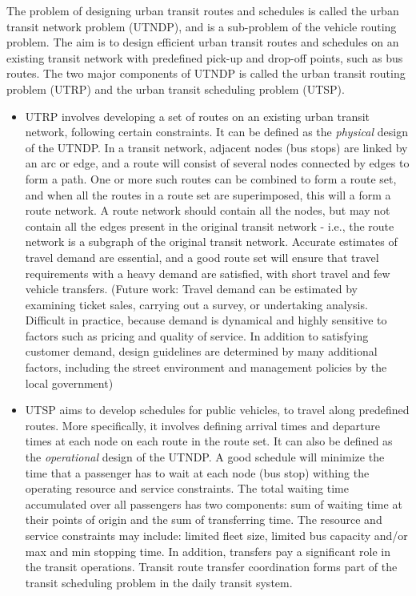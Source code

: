 The problem of designing urban transit routes and schedules is called the urban transit network problem (UTNDP), and is a sub-problem of the vehicle routing problem. The aim is to design efficient urban transit routes and schedules on an existing transit network with predefined pick-up and drop-off points, such as bus routes. The two major components of UTNDP is called the urban transit routing problem (UTRP) and the urban transit scheduling problem (UTSP).

\begin{itemize}
\item UTRP involves developing a set of routes on an existing urban transit network, following certain constraints. It can be defined as the \textit{physical} design of the UTNDP. In a transit network, adjacent nodes (bus stops) are linked by an arc or edge, and a route will consist of several nodes connected by edges to form a path. One or more such routes can be combined to form a route set, and when all the routes in a route set are superimposed, this will a form a route network. A route network should contain all the nodes, but may not contain all the edges present in the original transit network - i.e., the route network is a subgraph of the original transit network.  Accurate estimates of travel demand are essential, and a good route set will ensure that travel requirements with a heavy demand are satisfied, with short travel and few vehicle transfers. (Future work: Travel demand can be estimated by examining ticket sales, carrying out a survey, or undertaking analysis. Difficult in practice, because demand is dynamical and highly sensitive to factors such as pricing and quality of service. In addition to satisfying customer demand, design guidelines are determined by many additional factors, including the street environment and management policies by the local government)
\item UTSP aims to develop schedules for public vehicles, to travel along predefined routes. More specifically, it involves defining arrival times and departure times at each node on each route in the route set. It can also be defined as the \textit{operational} design of the UTNDP. A good schedule will minimize the time that a passenger has to wait at each node (bus stop) withing the operating resource and service constraints. The total waiting time accumulated over all passengers has two components: sum of waiting time at their points of origin and the sum of transferring time. The resource and service constraints may include: limited fleet size, limited bus capacity and/or max and min stopping time. In addition, transfers pay a significant role in the transit operations. Transit route transfer coordination forms part of the transit scheduling problem in the daily transit system. 

\end{itemize}

